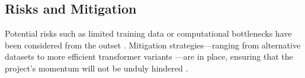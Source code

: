 \subsection{Risks and Mitigation}
Potential risks such as limited training data or computational bottlenecks have been considered from the outset \cite{RefWorks:RefID:22-gao2020pile:}. Mitigation strategies—ranging from alternative datasets \cite{RefWorks:RefID:26-liu2024datasets} to more efficient transformer variants \cite{RefWorks:RefID:21-fedus2022switch}—are in place, ensuring that the project’s momentum will not be unduly hindered \cite{RefWorks:RefID:18-rajbhandarizero:}.